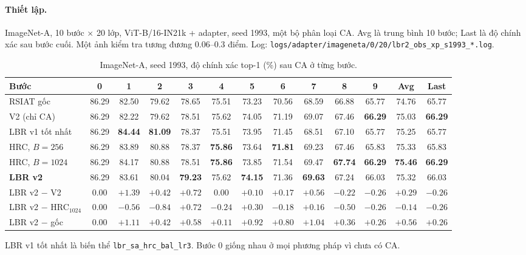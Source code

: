 \documentclass[11pt]{article}
\begin{document}
\paragraph{Thiết lập.} ImageNet-A, 10 bước $\times$ 20 lớp, ViT-B/16-IN21k + adapter, seed 1993, một bộ phân loại CA.
Avg là trung bình 10 bước; Last là độ chính xác sau bước cuối. Một ảnh kiểm tra tương đương $0.06$--$0.3$ điểm.
Log: \texttt{logs/adapter/imageneta/0/20/lbr2\_obs\_xp\_s1993\_*.log}.

\begin{table}[H]
\centering\small
\caption{ImageNet-A, seed 1993, độ chính xác top-1 (\%) sau CA ở từng bước.}
\setlength{\tabcolsep}{3.0pt}
\begin{tabular}{l*{10}{c}cc}
\toprule
Bước & 0 & 1 & 2 & 3 & 4 & 5 & 6 & 7 & 8 & 9 & Avg & Last\\
\midrule
RSIAT gốc & 86.29 & 82.50 & 79.62 & 78.65 & 75.51 & 73.23 & 70.56 & 68.59 & 66.88 & 65.77 & 74.76 & 65.77\\
V2 (chỉ CA) & 86.29 & 82.22 & 79.62 & 78.51 & 75.62 & 74.05 & 71.19 & 69.07 & 67.46 & \textbf{66.29} & 75.03 & \textbf{66.29}\\
LBR v1 tốt nhất & 86.29 & \textbf{84.44} & \textbf{81.09} & 78.37 & 75.51 & 73.95 & 71.45 & 68.51 & 67.10 & 65.77 & 75.25 & 65.77\\
HRC, $B=256$ & 86.29 & 83.89 & 80.88 & 78.37 & \textbf{75.86} & 73.64 & \textbf{71.81} & 69.23 & 67.46 & 65.83 & 75.33 & 65.83\\
HRC, $B=1024$ & 86.29 & 84.17 & 80.88 & 78.51 & \textbf{75.86} & 73.85 & 71.54 & 69.47 & \textbf{67.74} & \textbf{66.29} & \textbf{75.46} & \textbf{66.29}\\
\textbf{LBR v2} & 86.29 & 83.61 & 80.04 & \textbf{79.23} & 75.62 & \textbf{74.15} & 71.36 & \textbf{69.63} & 67.24 & 66.03 & 75.32 & 66.03\\
\midrule
LBR v2 $-$ V2 & 0.00 & $+1.39$ & $+0.42$ & $+0.72$ & 0.00 & $+0.10$ & $+0.17$ & $+0.56$ & $-0.22$ & $-0.26$ & $+0.29$ & $-0.26$\\
LBR v2 $-$ HRC$_{1024}$ & 0.00 & $-0.56$ & $-0.84$ & $+0.72$ & $-0.24$ & $+0.30$ & $-0.18$ & $+0.16$ & $-0.50$ & $-0.26$ & $-0.14$ & $-0.26$\\
LBR v2 $-$ gốc & 0.00 & $+1.11$ & $+0.42$ & $+0.58$ & $+0.11$ & $+0.92$ & $+0.80$ & $+1.04$ & $+0.36$ & $+0.26$ & $+0.56$ & $+0.26$\\
\bottomrule
\end{tabular}
\end{table}
LBR v1 tốt nhất là biến thể \texttt{lbr\_sa\_hrc\_bal\_lr3}. Bước 0 giống nhau ở mọi phương pháp vì chưa có CA.
\end{document}
